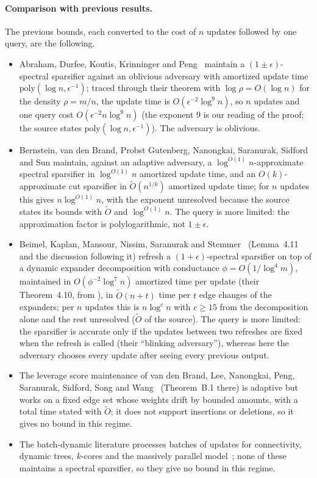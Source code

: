 \documentclass[11pt]{article}
\theoremstyle{remark}
\newcommand{\poly}{\mathrm{poly}}
\begin{document}
\paragraph{Comparison with previous results.}
The previous bounds, each converted to the cost of $n$ updates followed by
one query, are the following.
\begin{itemize}[leftmargin=*]
\item Abraham, Durfee, Koutis, Krinninger and Peng~\cite{ADKKP16:conf}
maintain a $(1\pm\epsilon)$-spectral sparsifier against an oblivious
adversary with amortized update time $\poly(\log n,\epsilon^{-1})$; traced
through their theorem with $\log\rho=O(\log n)$ for the density $\rho=m/n$,
the update time is $O(\epsilon^{-2}\log^{9}n)$, so $n$ updates and one query
cost $O(\epsilon^{-2}n\log^{9}n)$ (the exponent $9$ is our reading of the
proof; the source states $\poly(\log n,\epsilon^{-1})$).
The adversary is oblivious.
\item Bernstein, van den Brand, Probst Gutenberg, Nanongkai, Saranurak,
Sidford and Sun \cite{BBGNSSS22:conf} maintain, against an adaptive
adversary, a $\log^{O(1)}n$-approximate spectral sparsifier in
$\log^{O(1)}n$ amortized update time, and an $O(k)$-approximate cut
sparsifier in $\widetilde O(n^{1/k})$ amortized update time; for $n$ updates
this gives $n\log^{O(1)}n$, with the exponent unresolved because the source
states its bounds with $\widetilde O$ and $\log^{O(1)}n$.
The query is more limited: the approximation factor is polylogarithmic, not
$1\pm\epsilon$.
\item Beimel, Kaplan, Mansour, Nissim, Saranurak and Stemmer~\cite{BKMNSS22:conf}
(Lemma~4.11 and the discussion following it) refresh a
$(1+\epsilon)$-spectral sparsifier on top of a dynamic expander
decomposition with conductance $\phi=O(1/\log^{4}m)$, maintained in
$O(\phi^{-2}\log^{7}n)$ amortized time per update (their Theorem~4.10, from
\cite{BBGNSSS22:conf}), in $\widetilde O(n+t)$ time per $t$ edge changes of
the expanders; per $n$ updates this is $n\log^{c}n$ with $c\ge15$ from the
decomposition alone and the rest unresolved ($\widetilde O$ of the source).
The query is more limited: the sparsifier is accurate only if the updates
between two refreshes are fixed when the refresh is called (their
``blinking adversary''), whereas here the adversary chooses every update
after seeing every previous output.
\item The leverage score maintenance of van den Brand, Lee, Nanongkai, Peng,
Saranurak, Sidford, Song and Wang~\cite{BLNPSSSW20:conf} (Theorem~B.1 there)
is adaptive but works on a fixed edge set whose weights drift by bounded
amounts, with a total time stated with $\widetilde O$; it does not support
insertions or deletions, so it gives no bound in this regime.
\item The batch-dynamic literature processes batches of updates for
connectivity, dynamic trees, $k$-cores and the massively parallel
model~\cite{AABD19:conf,TDB19:conf,ILMP19:conf,DDKPSS20:conf,AABDW20:conf,NO21:conf,LSYDS22:conf};
none of these maintains a spectral sparsifier, so they give no bound in
this regime.
\end{itemize}
\end{document}
